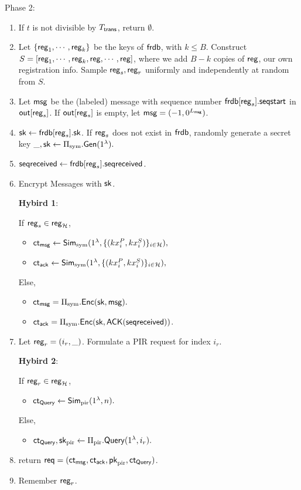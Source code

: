 Phase 2:
\begin{enumerate}
    \item If $t$ is not divisible by $T_{\mathsf{trans}}$, return $\emptyset$.
    \item Let $\{\mathsf{reg}_1, \cdots, \mathsf{reg}_k\}$ be the keys of $\mathsf{frdb}$, with $k\leq B$. Construct $S = [\mathsf{reg}_1,\cdots, \mathsf{reg}_k, \mathsf{reg}, \cdots, \mathsf{reg}]$, where we add $B - k$ copies of $\mathsf{reg}$, our own registration info. Sample $\mathsf{reg}_s, \mathsf{reg}_r$ uniformly and independently at random from $S$. 
    \item Let $\mathsf{msg}$ be the (labeled) message with sequence number $\mathsf{frdb}[\mathsf{reg}_s].\mathsf{seqstart}$ in $\mathsf{out}[\mathsf{reg}_s]$. If $\mathsf{out}[\mathsf{reg}_s]$ is empty, let $\mathsf{msg} = (-1, 0^{L_{\mathsf{msg}}})$.
    \item ${\mathsf{sk}} \leftarrow \mathsf{frdb}[\mathsf{reg}_s].{\mathsf{sk}}$. If $\mathsf{reg}_s$ does not exist in $\mathsf{frdb}$, randomly generate a secret key $\_, {\mathsf{sk}} \leftarrow \Pi_{\text{sym}}.\mathsf{Gen}(1^{\lambda}).$
    \item $\mathsf{seqreceived} \leftarrow \mathsf{frdb}[\mathsf{reg}_s].\mathsf{seqreceived}$.
    \item Encrypt Messages with ${\mathsf{sk}}$.
    
    {\color{red} 
    \textbf{Hybird 1}:
    
    If $\mathsf{reg}_s \in \mathsf{reg}_{\mathcal{H}}$, 
    \begin{itemize}
        \item $\mathsf{ct}_{\mathsf{msg}} \leftarrow \mathsf{Sim}_{\text{sym}}(1^{\lambda},\{(kx_i^P, kx_i^S)\}_{i \in \mathcal{H}}),$
        \item $\mathsf{ct}_{\mathsf{ack}} \leftarrow \mathsf{Sim}_{\text{sym}}(1^{\lambda},\{(kx_i^P, kx_i^S)\}_{i \in \mathcal{H}}),$
    \end{itemize}
    Else, 
    }
    
    
    \begin{itemize}
        \item $\mathsf{ct}_{\mathsf{msg}} = \Pi_{\text{sym}}.\mathsf{Enc}({\mathsf{sk}}, \mathsf{msg}).$
        \item $\mathsf{ct}_{\mathsf{ack}} = \Pi_{\text{sym}}.\mathsf{Enc}({\mathsf{sk}}, \mathsf{ACK}(\mathsf{seqreceived}))$.
    \end{itemize}
    \item Let $\mathsf{reg}_r = (i_r, \_)$. Formulate a PIR request for index $i_r$. 
    
     {
     \color{red}
          
     \textbf{Hybird 2}:
         
     If $\mathsf{reg}_r \in \mathsf{reg}_{\mathcal{H}}$, 
    \begin{itemize}
        \item $\mathsf{ct}_{\mathsf{Query}} \leftarrow \mathsf{Sim}_{\text{pir}}(1^{\lambda}, n).$
    \end{itemize}
    Else, 
    }
    \begin{itemize}
        \item $\mathsf{ct}_{\mathsf{Query}}, {\mathsf{sk}}_{\text{pir}} \leftarrow \Pi_{\text{pir}}.\mathsf{Query}(1^{\lambda}, i_r).$
    \end{itemize}
    \item return $\mathsf{req} = (\mathsf{ct}_{\mathsf{msg}}, \mathsf{ct}_{\mathsf{ack}}, \mathsf{pk}_{\text{pir}}, \mathsf{ct}_{\mathsf{Query}})$.
    \item Remember $\mathsf{reg}_r$.
\end{enumerate}
